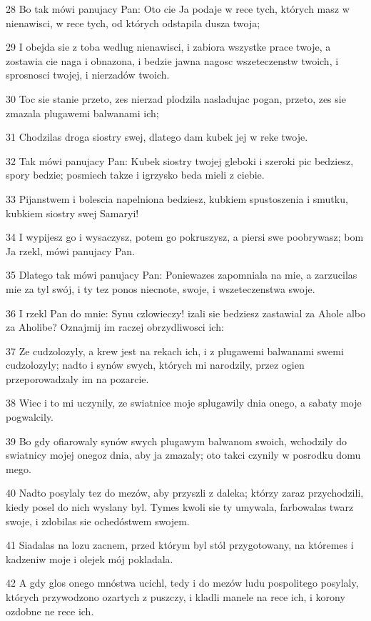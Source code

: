 \par 28 Bo tak mówi panujacy Pan: Oto cie Ja podaje w rece tych, których masz w nienawisci, w rece tych, od których odstapila dusza twoja;
\par 29 I obejda sie z toba wedlug nienawisci, i zabiora wszystke prace twoje, a zostawia cie naga i obnazona, i bedzie jawna nagosc wszeteczenstw twoich, i sprosnosci twojej, i nierzadów twoich.
\par 30 Toc sie stanie przeto, zes nierzad plodzila nasladujac pogan, przeto, zes sie zmazala plugawemi balwanami ich;
\par 31 Chodzilas droga siostry swej, dlatego dam kubek jej w reke twoje.
\par 32 Tak mówi panujacy Pan: Kubek siostry twojej gleboki i szeroki pic bedziesz, spory bedzie; posmiech takze i igrzysko beda mieli z ciebie.
\par 33 Pijanstwem i bolescia napelniona bedziesz, kubkiem spustoszenia i smutku, kubkiem siostry swej Samaryi!
\par 34 I wypijesz go i wysaczysz, potem go pokruszysz, a piersi swe poobrywasz; bom Ja rzekl, mówi panujacy Pan.
\par 35 Dlatego tak mówi panujacy Pan: Poniewazes zapomniala na mie, a zarzucilas mie za tyl swój, i ty tez ponos niecnote, swoje, i wszeteczenstwa swoje.
\par 36 I rzekl Pan do mnie: Synu czlowieczy! izali sie bedziesz zastawial za Ahole albo za Aholibe? Oznajmij im raczej obrzydliwosci ich:
\par 37 Ze cudzolozyly, a krew jest na rekach ich, i z plugawemi balwanami swemi cudzolozyly; nadto i synów swych, których mi narodzily, przez ogien przeporowadzaly im na pozarcie.
\par 38 Wiec i to mi uczynily, ze swiatnice moje splugawily dnia onego, a sabaty moje pogwalcily.
\par 39 Bo gdy ofiarowaly synów swych plugawym balwanom swoich, wchodzily do swiatnicy mojej onegoz dnia, aby ja zmazaly; oto takci czynily w posrodku domu mego.
\par 40 Nadto posylaly tez do mezów, aby przyszli z daleka; którzy zaraz przychodzili, kiedy posel do nich wyslany byl. Tymes kwoli sie ty umywala, farbowalas twarz swoje, i zdobilas sie ochedóstwem swojem.
\par 41 Siadalas na lozu zacnem, przed którym byl stól przygotowany, na któremes i kadzeniw moje i olejek mój pokladala.
\par 42 A gdy glos onego mnóstwa ucichl, tedy i do mezów ludu pospolitego posylaly, których przywodzono ozartych z puszczy, i kladli manele na rece ich, i korony ozdobne ne rece ich.
